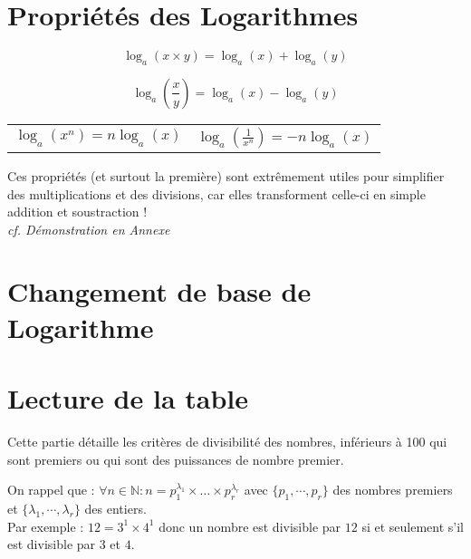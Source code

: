 \documentclass[a4paper]{article}
\begin{document}
\pagebreak

\section*{Propriétés des Logarithmes}

	{\Huge $$ \log_a ( x \times y ) = \log_a (x) + \log_a (y) $$}
	
	{\large $$ \log_a \left( \frac{x}{y} \right)       = \log_a (x) - \log_a (y) $$ }

\begin{center}
\begin{large}
	\begin{tabular}{c|c}
	$ \log_a ( x^n )               =   n \log_a (x) $ &
	$ \log_a \left( \frac{1}{x^{n}} \right) = - n \log_a (x) $ \\
	\end{tabular}
\end{large}
	\end{center}
	
	Ces propriétés (et surtout la première) sont extrêmement utiles pour simplifier des multiplications et des divisions, car elles transforment celle-ci en simple addition et soustraction !\\
	
	\textit{cf. Démonstration en Annexe}
	
	
	
	

\pagebreak

\section*{Changement de base de Logarithme}

\pagebreak

\section*{Lecture de la table}

	Cette partie détaille les critères de divisibilité des nombres, inférieurs à 100 qui sont premiers ou qui sont des puissances de nombre premier.\\

	\par On rappel que : $ \forall n \in \mathbb{N}: n = p_{1}^{\lambda_1} \times \ldots \times p_{r}^{\lambda_r}$ avec $\{p_1,\cdots, p_r\}$ des nombres premiers et $\{\lambda_1,\cdots, \lambda_r\}$ des entiers.\\
	Par exemple : $12 = 3^1 \times 4^1$ donc un nombre est divisible par $12$ si et seulement s'il est divisible par $3$ et $4$.\\
\end{document}
